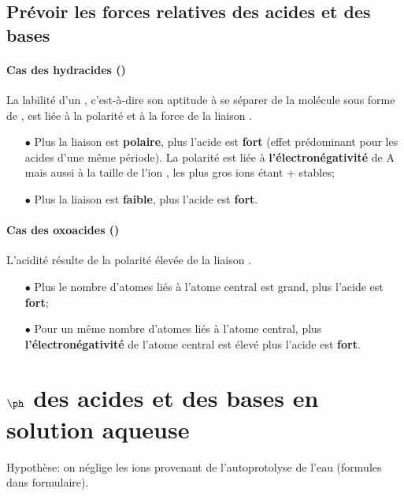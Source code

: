 \subsection{Prévoir les forces relatives des acides et des bases}

\paragraph{Cas des hydracides ()}
La labilité d'un ,
c'est-à-dire son aptitude à se séparer de la molécule  sous forme de ,
est liée à la polarité et à la force de la liaison .
\begin{itemize}
  \item[$\bullet$] Plus la liaison est \textbf{polaire},
    plus l'acide est \textbf{fort} (effet prédominant pour les acides d'une même période).
    La polarité est liée à \textbf{l'électronégativité} de A mais aussi à la taille de l'ion ,
    les plus gros ions étant + stables;
  \item[$\bullet$]Plus la liaison est \textbf{faible},
    plus l'acide est \textbf{fort}.
\end{itemize}

\paragraph{Cas des oxoacides ()}
L'acidité résulte de la polarité élevée de la liaison .
\begin{itemize}
  \item[$\bullet$] Plus le nombre d'atomes \textbf{} liés à l'atome central est grand,
    plus l'acide est \textbf{fort};
  \item[$\bullet$] Pour un même nombre d'atomes  liés à l'atome central,
    plus \textbf{l'électronégativité} de l'atome central est élevé plus l'acide est \textbf{fort}.
\end{itemize}

\section{$\ph$ des acides et des bases en solution aqueuse}

Hypothèse: on néglige les ions  provenant de l'autoprotolyse de l'eau (formules dans formulaire).

